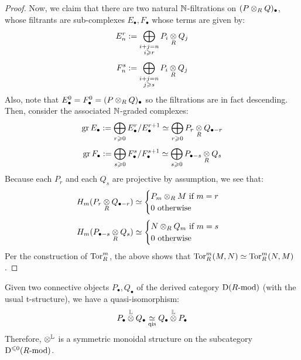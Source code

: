 \begin{proof}
                Now, we claim that there are two natural $\mathbb{N}$-filtrations on $(P \tensor_R Q)_{\bullet}$, whose filtrants are sub-complexes $E_{\bullet}, F_{\bullet}$ whose terms are given by:
                    $$E_n^r := \bigoplus_{ \substack{i + j = n \\ i \geq r} } P_i \tensor_R Q_j$$
                    $$F_n^s := \bigoplus_{ \substack{i + j = n \\ j \geq s} } P_i \tensor_R Q_j$$
                Also, note that $E_{\bullet}^0 = F_{\bullet}^0 = (P \tensor_R Q)_{\bullet}$ so the filtrations are in fact descending. Then, consider the associated $\mathbb{N}$-graded complexes:
                    $$\gr E_{\bullet} := \bigoplus_{r \geq 0} E_{\bullet}^r/E_{\bullet}^{r + 1} \cong \bigoplus_{r \geq 0} P_r \tensor_R Q_{\bullet - r}$$
                    $$\gr F_{\bullet} := \bigoplus_{s \geq 0} F_{\bullet}^s/F_{\bullet}^{s + 1} \cong \bigoplus_{s \geq 0} P_{\bullet - s} \tensor_R Q_s$$
                Because each $P_r$ and each $Q_s$ are projective by assumption, we see that:
                    $$
                        H_m(P_r \tensor_R Q_{\bullet - r}) \cong
                        \begin{cases}
                            \text{$P_m \tensor_R M$ if $m = r$}
                            \\
                            \text{$0$ otherwise}
                        \end{cases}
                    $$
                    $$
                        H_m(P_{\bullet - s} \tensor_R Q_s) \cong
                        \begin{cases}
                            \text{$N \tensor_R Q_m$ if $m = s$}
                            \\
                            \text{$0$ otherwise}
                        \end{cases}
                    $$
                Per the construction of $\mathrm{Tor}_R^m$, the above shows that $\mathrm{Tor}_R^m(M, N) \simeq \mathrm{Tor}_R^m(N, M)$.
            \end{proof}
        \begin{corollary} \label{coro: symmetry_of_derived_tensor_products}
            Given two connective objects $P_{\bullet}, Q_{\bullet}$ of the derived category $\mathrm{D}(R\text{-}\mathrm{mod})$ (with the usual t-structure), we have a quasi-isomorphism:
                $$P_{\bullet} \tensor^{\L} Q_{\bullet} \underset{\qis}{\cong} Q_{\bullet} \tensor^{\L} P_{\bullet}$$
            Therefore, $\tensor^{\L}$ is a symmetric monoidal structure on the subcategory $\mathrm{D}^{\leqslant 0}(R\text{-}\mathrm{mod})$.
        \end{corollary}

